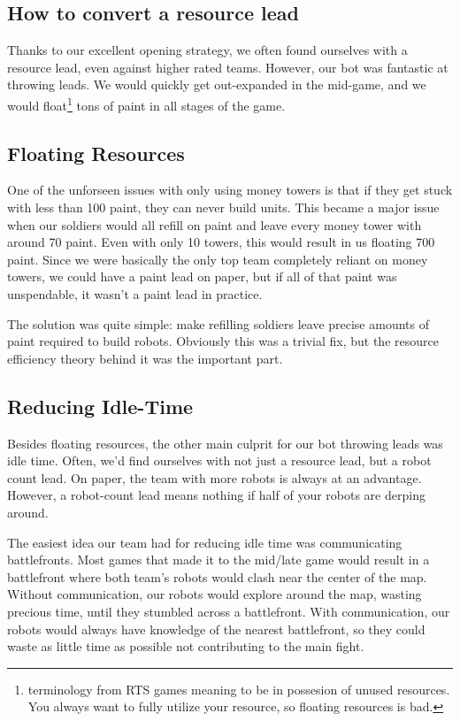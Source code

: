 \subsection{How to convert a resource lead}

Thanks to our excellent opening strategy, we often found ourselves with a resource lead, even against higher rated teams. However, our bot was fantastic at throwing leads. We would quickly get out-expanded in the mid-game, and we would float\footnote{terminology from RTS games meaning to be in possesion of unused resources. You always want to fully utilize your resource, so floating resources is bad.} tons of paint in all stages of the game.

\subsection{Floating Resources}

One of the unforseen issues with only using money towers is that if they get stuck with less than 100 paint, they can never build units. This became a major issue when our soldiers would all refill on paint and leave every money tower with around 70 paint. Even with only 10 towers, this would result in us floating 700 paint. Since we were basically the only top team completely reliant on money towers, we could have a paint lead on paper, but if all of that paint was unspendable, it wasn't a paint lead in practice.

\medskip

The solution was quite simple: make refilling soldiers leave precise amounts of paint required to build robots. Obviously this was a trivial fix, but the resource efficiency theory behind it was the important part.

\subsection{Reducing Idle-Time}

Besides floating resources, the other main culprit for our bot throwing leads was idle time. Often, we'd find ourselves with not just a resource lead, but a robot count lead. On paper, the team with more robots is always at an advantage. However, a robot-count lead means nothing if half of your robots are derping around.

\medskip

The easiest idea our team had for reducing idle time was communicating battlefronts. Most games that made it to the mid/late game would result in a battlefront where both team's robots would clash near the center of the map. Without communication, our robots would explore around the map, wasting precious time, until they stumbled across a battlefront. With communication, our robots would always have knowledge of the nearest battlefront, so they could waste as little time as possible not contributing to the main fight.


